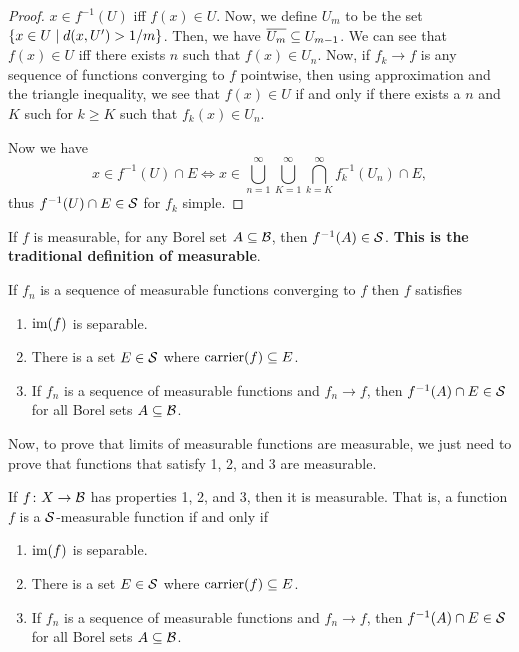 \begin{proof}
    $x \in f^{-1}(U)$ iff $f(x) \in U$. Now, we define $U_m$ to be the set $\qty{x \in U \mid d(x, U') > 1/m}$. Then, we have $\overline{U_m} \subseteq U_{m - 1}$. We can see that $f(x) \in U$ iff there exists $n$ such that $f(x) \in U_n$. Now, if $f_k \to f$ is any sequence of functions converging to $f$ pointwise, then using approximation and the triangle inequality, we see that $f(x) \in U$ if and only if there exists a $n$ and $K$ such for $k \ge K$ such that $f_k(x) \in U_n$.

    Now we have \[x \in f^{-1}(U) \cap E\iff x \in \bigcup_{n = 1}^\infty \bigcup_{K = 1}^\infty \bigcap_{k = K}^\infty f_k^{-1}(U_n) \cap E,\] thus $f^{-1}(U) \cap E \in \mathcal S$ for $f_k$ simple.
\end{proof}

\begin{corollary}
    If $f$ is measurable, for any Borel set $A \subseteq \mathcal B$, then $f^{-1}(A) \in \mathcal S$. \textbf{This is the traditional definition of measurable}.
\end{corollary}

\begin{corollary}
    If $f_n$ is a sequence of measurable functions converging to $f$ then $f$ satisfies
    \begin{enumerate}
        \item $\operatorname{im}(f)$ is separable.
        \item There is a set $E \in \mathcal S$ where $\operatorname{carrier}(f) \subseteq E$.
        \item If $f_n$ is a sequence of measurable functions and $f_n \to f$, then $f^{-1}(A) \cap E\in \mathcal S$ for all Borel sets $A \subseteq \mathcal B$. 
    \end{enumerate}
\end{corollary}

Now, to prove that limits of measurable functions are measurable, we just need to prove that functions that satisfy 1, 2, and 3 are measurable.

\begin{theorem}
    If $f \colon X \to \mathcal B$ has properties 1, 2, and 3, then it is measurable. That is, a function $f$ is a $\mathcal S$-measurable function if and only if \begin{enumerate}
        \item $\operatorname{im}(f)$ is separable.
        \item There is a set $E \in \mathcal S$ where $\operatorname{carrier}(f) \subseteq E$.
        \item If $f_n$ is a sequence of measurable functions and $f_n \to f$, then $f^{-1}(A) \cap E\in \mathcal S$ for all Borel sets $A \subseteq \mathcal B$. 
    \end{enumerate}
\end{theorem}

